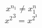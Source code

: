 \documentclass{article}
\begin{document}
\[
  x^{n_1} \neq x^n_1
\]
\[
  {x^2}^3 = x^{2^3}
\]
\end{document}
